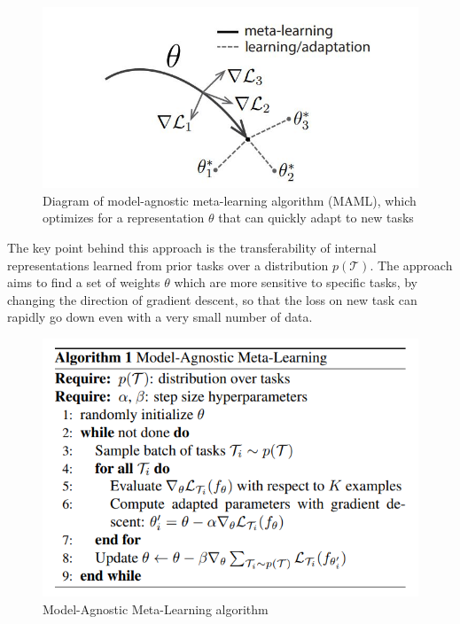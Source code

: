 \begin{figure}[H]
	\includegraphics[scale=0.6]{MAML_01.JPG}
	\centering
	\caption{Diagram of model-agnostic meta-learning algorithm (MAML), which optimizes for a representation $\theta$ that can
    quickly adapt to new tasks}
	\label{MAML}
\end{figure}

The key point behind this approach is the transferability of internal representations learned from prior tasks over a distribution $p(\mathcal{T})$. The approach aims to find a set of weights $\theta$ which are more sensitive to specific tasks, by changing the direction of gradient descent, so that the loss on new task can rapidly go down even with a very small number of data.  

\begin{figure}[H]
	\includegraphics[scale=0.65]{MAML_02.PNG}
	\centering
	\caption{Model-Agnostic Meta-Learning algorithm}
	\label{MAML}
\end{figure}


